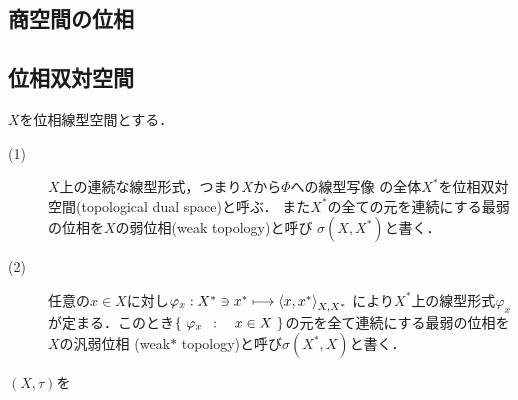 	\begin{screen}
		\begin{thm}[局所凸空間とはセミノルムの族で生成される空間]
			
		\end{thm}
	\end{screen}
	
\subsection{商空間の位相}

\subsection{位相双対空間}
	\begin{screen}
		\begin{dfn}
			$X$を位相線型空間とする．
			\begin{description}
				\item[(1)] $X$上の連続な線型形式，つまり$X$から$\Phi$への線型写像
					の全体$X^*$を位相双対空間(topological dual space)と呼ぶ．
					また$X^*$の全ての元を連続にする最弱の位相を$X$の弱位相(weak topology)と呼び
					$\sigma(X,X^*)$と書く．
				
				\item[(2)] 任意の$x \in X$に対し$\varphi_x:X^* \ni x^* \longmapsto \inprod<x,x^*>_{X,X^*}$
					により$X^*$上の線型形式$\varphi_x$が定まる．このとき$\left\{\ \varphi_x\ \, : \quad x \in X\ \right\}$の元を全て連続にする最弱の位相を$X$の汎弱位相
					(weak$\ast$ topology)と呼び$\sigma(X^*,X)$と書く．
			\end{description}
		\end{dfn}
	\end{screen}
	
	\begin{screen}
		\begin{thm}
		\end{thm}
	\end{screen}
	
	\begin{screen}
		\begin{thm}[位相的双対空間の全ての元を連続にする最弱の位相は局所凸線型位相]
			$(X,\tau)$を
		\end{thm}
	\end{screen}